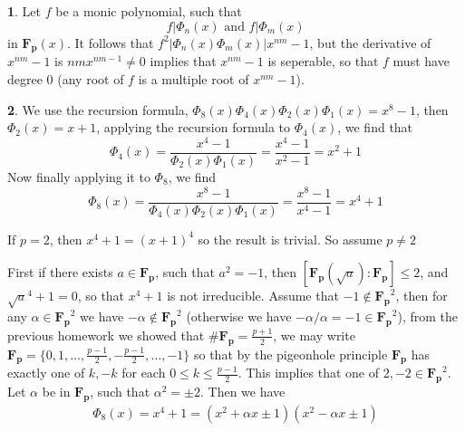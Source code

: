 \documentclass[11pt]{article}
\theoremstyle{definition}
\newtheorem{pb}{}
\newcommand{\set}[1]{\{#1\}}
\newcommand{\tand}{\text{ and }}
\begin{document}
    \begin{pb}
        Let \(f\) be a monic polynomial, such that \[f \vert \Phi_n(x) \tand f \vert \Phi_m(x)\] in \(\mathbf{F_p}(x)\). It follows that \(f^2 \vert \Phi_n(x)\Phi_m(x) \vert x^{nm} - 1\), but
        the derivative of \(x^{nm} - 1\) is \(nmx^{nm-1} \neq 0\) implies that \(x^{nm} - 1\) is seperable, so that \(f\) must have degree \(0\) (any root of \(f\) is a multiple root of \(x^{nm}-1\)).
    \end{pb}
    \begin{pb}
        We use the recursion formula, \(\Phi_8(x)\Phi_4(x)\Phi_2(x)\Phi_1(x) = x^8 - 1\), then
        \(\Phi_2(x) = x+1\), applying the recursion formula to \(\Phi_4(x)\), we find that
        \[\Phi_4(x) = \frac{x^4-1}{\Phi_2(x)\Phi_1(x)} = \frac{x^4-1}{x^2 - 1} = x^2 + 1\]
        Now finally applying it to \(\Phi_8\), we find
        \[\Phi_8(x) = \frac{x^8-1}{\Phi_4(x)\Phi_2(x)\Phi_1(x)} 
        =\frac{x^8-1}{x^4-1} = x^4 + 1\]

        If \(p = 2\), then \(x^4 + 1 = (x+1)^4\) so the result is trivial. So assume \(p \neq 2\)

        First if there exists \(a \in \mathbf{F_p}\), such that \(a^2 = -1\), then \([\mathbf{F_p}(\sqrt{a}):\mathbf{F_p}] \leq 2\), and \(\sqrt{a}^4 + 1 = 0\), so that \(x^4 + 1\) is not irreducible. Assume that \(-1 \not \in \mathbf{F_p}^2\), then for any \(\alpha \in \mathbf{F_p}^2\) we have \(-\alpha \not \in \mathbf{F_p}^2\) (otherwise we have \(-\alpha/\alpha = -1 \in \mathbf{F_p}^2\)), from the previous homework we showed that \(\# \mathbf{F_p} = \frac{p+1}{2}\), we may write \(\mathbf{F_p} = \set{0,1,\hdots,\frac{p-1}{2}, -\frac{p-1}{2},\hdots,-1}\) so that by the pigeonhole principle \(\mathbf{F_p}\) has exactly one of \(k,-k\) for each \(0 \leq k \leq \frac{p-1}{2}\). This implies that one of \(2,-2 \in \mathbf{F_p}^2\). Let \(\alpha\) be in \(\mathbf{F_p}\), such that \(\alpha^2 = \pm 2\). Then we have
        \begin{align*}
            \Phi_8(x) = x^4 + 1 = (x^2 + \alpha x \pm 1)(x^2 - \alpha x \pm 1)
        \end{align*}
    \end{pb}
\end{document}
